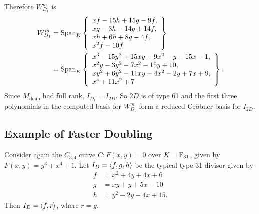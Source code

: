 Therefore $W_{D_1}^m$ is
\begin{align*}
  W_{D_1}^m &= \operatorname{Span}_K
\left\{ \begin{array}{l}
    xf - 15h + 15g - 9f, \\
    xg - 3h - 14g + 14f, \\
    xh + 6h + 8g - 4f, \\
    x^2f - 10f
\end{array} \right\} \\
&= \operatorname{Span}_K
\left\{ \begin{array}{l}
    x^3 - 15y^2 + 15xy - 9x^2 - y - 15x - 1, \\
    x^2y - 3y^2 - 7x^2 - 15y + 10, \\ 
    xy^2 + 6y^2 - 11xy - 4x^2 - 2y + 7x + 9, \\
    x^4 + 11x^2 + 7
\end{array} \right\}.
\end{align*}
Since $M_{\text{doub}}$ had full rank, $I_{D_1} = I_{2D}$.
So $2D$ is of type 61 and the first three polynomials
in the computed basis for $W_{D_1}^m$ form a reduced Gr\"obner basis for $I_{2D}$.




\subsection{Example of Faster Doubling}
\label{sec_fast_doubling_example}

Consider again the $C_{3,4}$ curve $C : F(x,y) = 0$ over $K = \mathbb{F}_{31}$,
given by $F(x,y) = y^3 + x^4 + 1$.
Let $I_D = \left\langle f,g,h \right\rangle$ be the typical type 31 divisor given by
\begin{align*}
  f &= x^2 + 4y + 4x + 6 \\
  g &= xy + y + 5x - 10 \\
  h &= y^2 - 2y - 4x + 15.
\end{align*}
Then $I_D = \left\langle f,r \right\rangle$, where $r = g$.

